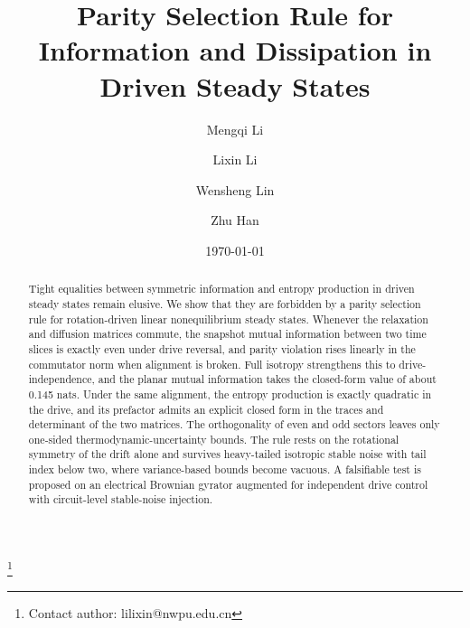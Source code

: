 \documentclass[%
 reprint,
 superscriptaddress,
 nofootinbib,
 nobibnotes,
 amsmath,amssymb,
 aps,
 prl,
 floatfix,
]{revtex4-2}
\begin{document}

\title{Parity Selection Rule for Information and Dissipation in Driven Steady States}%

\author{Mengqi Li}
%

\author{Lixin Li}%
 \thanks{Contact author: lilixin@nwpu.edu.cn}%
%

\author{Wensheng Lin}%
%

\author{Zhu Han}
%

\date{\today}

\begin{abstract}
Tight equalities between symmetric information and entropy production in driven steady states remain elusive. We show that they are forbidden by a parity selection rule for rotation-driven linear nonequilibrium steady states. Whenever the relaxation and diffusion matrices commute, the snapshot mutual information between two time slices is exactly even under drive reversal, and parity violation rises linearly in the commutator norm when alignment is broken. Full isotropy strengthens this to drive-independence, and the planar mutual information takes the closed-form value of about 0.145 nats. Under the same alignment, the entropy production is exactly quadratic in the drive, and its prefactor admits an explicit closed form in the traces and determinant of the two matrices. The orthogonality of even and odd sectors leaves only one-sided thermodynamic-uncertainty bounds. The rule rests on the rotational symmetry of the drift alone and survives heavy-tailed isotropic stable noise with tail index below two, where variance-based bounds become vacuous. A falsifiable test is proposed on an electrical Brownian gyrator augmented for independent drive control with circuit-level stable-noise injection.
\end{abstract}

\maketitle
\end{document}
